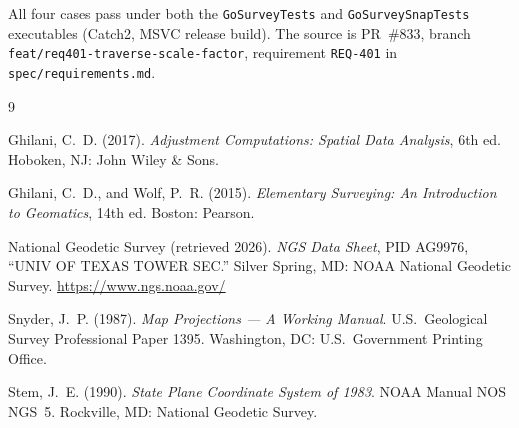 \documentclass[11pt]{article}
\begin{document}
All four cases pass under both the \texttt{GoSurveyTests} and
\texttt{GoSurveySnapTests} executables (Catch2, MSVC release build). The
source is PR~\#833, branch \texttt{feat/req401-traverse-scale-factor},
requirement \texttt{REQ-401} in \texttt{spec/requirements.md}.

\begin{thebibliography}{9}

Ghilani, C.~D. (2017). \emph{Adjustment Computations: Spatial Data
Analysis}, 6th ed. Hoboken, NJ: John Wiley \& Sons.

Ghilani, C.~D., and Wolf, P.~R. (2015). \emph{Elementary Surveying: An
Introduction to Geomatics}, 14th ed. Boston: Pearson.

National Geodetic Survey (retrieved 2026). \emph{NGS Data Sheet}, PID
AG9976, ``UNIV OF TEXAS TOWER SEC.'' Silver Spring, MD: NOAA National
Geodetic Survey. \url{https://www.ngs.noaa.gov/}

Snyder, J.~P. (1987). \emph{Map Projections --- A Working Manual}. U.S.\
Geological Survey Professional Paper 1395. Washington, DC: U.S.\
Government Printing Office.

Stem, J.~E. (1990). \emph{State Plane Coordinate System of 1983}. NOAA
Manual NOS NGS~5. Rockville, MD: National Geodetic Survey.

\end{thebibliography}
\end{document}
